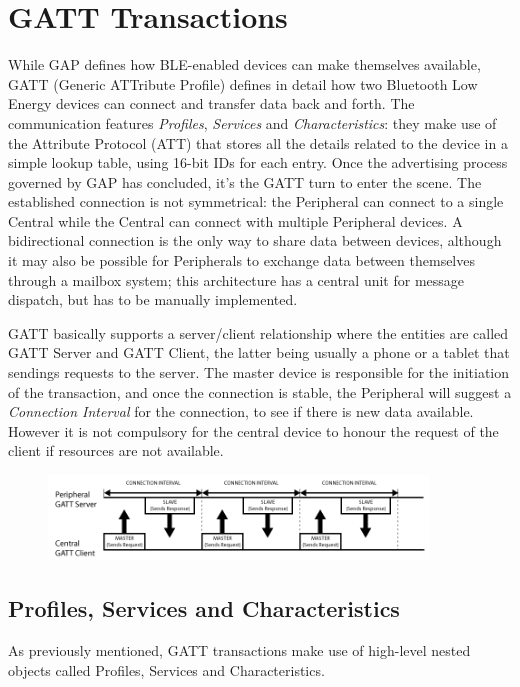 \section{GATT Transactions}
While GAP defines how BLE-enabled devices can make themselves available, GATT (Generic ATTribute Profile) defines in detail how two Bluetooth Low Energy devices can connect and transfer data back and forth.
The communication features \textit{Profiles}, \textit{Services} and \textit{Characteristics}: they make use of the Attribute Protocol (ATT) that stores all the details related to the device in a simple lookup table, using 16-bit IDs for each entry.
Once the advertising process governed by GAP has concluded, it's the GATT turn to enter the scene. The established connection is not symmetrical: the Peripheral can connect to a single Central while the Central can connect with multiple Peripheral devices. A bidirectional connection is the only way to share data between devices, although it may also be possible for Peripherals to exchange data between themselves through a mailbox system; this architecture has a central unit for message dispatch, but has to be manually implemented.

GATT basically supports a server/client relationship where the entities are called GATT Server and GATT Client, the latter being usually a phone or a tablet that sendings requests to the server. The master device is responsible for the initiation of the transaction, and once the connection is stable, the Peripheral will suggest a \textit{Connection Interval} for the connection, to see if there is new data available. However it is not compulsory for the central device to honour the request of the client if resources are not available.

\begin{figure}
	\centering	
		\includegraphics[width=0.9\textwidth]{gatt.png}
	\label{fig:gatt}
\end{figure}

\subsection{Profiles, Services and Characteristics}
As previously mentioned, GATT transactions make use of high-level nested objects called Profiles, Services and Characteristics.

